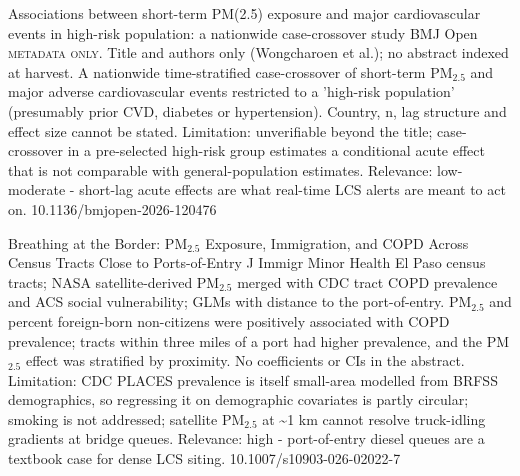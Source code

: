 \documentclass[10pt]{article}
\begin{document}
{Associations between short-term PM(2.5) exposure and major cardiovascular events in high-risk population: a nationwide case-crossover study}
{BMJ Open}
{\textsc{metadata only.} Title and authors only (Wongcharoen et al.); no abstract indexed at harvest. A nationwide time-stratified case-crossover of short-term PM$_{2.5}$ and major adverse cardiovascular events restricted to a 'high-risk population' (presumably prior CVD, diabetes or hypertension). Country, n, lag structure and effect size cannot be stated. Limitation: unverifiable beyond the title; case-crossover in a pre-selected high-risk group estimates a conditional acute effect that is not comparable with general-population estimates. Relevance: low-moderate - short-lag acute effects are what real-time LCS alerts are meant to act on.}
{10.1136/bmjopen-2026-120476}

\par{}\baselineskip{}\baselineskip
{}

{Breathing at the Border: PM$_{2.5}$ Exposure, Immigration, and COPD Across Census Tracts Close to Ports-of-Entry}
{J Immigr Minor Health}
{El Paso census tracts; NASA satellite-derived PM$_{2.5}$ merged with CDC tract COPD prevalence and ACS social vulnerability; GLMs with distance to the port-of-entry. PM$_{2.5}$ and percent foreign-born non-citizens were positively associated with COPD prevalence; tracts within three miles of a port had higher prevalence, and the PM$_{2.5}$ effect was stratified by proximity. No coefficients or CIs in the abstract. Limitation: CDC PLACES prevalence is itself small-area modelled from BRFSS demographics, so regressing it on demographic covariates is partly circular; smoking is not addressed; satellite PM$_{2.5}$ at \textasciitilde{}1 km cannot resolve truck-idling gradients at bridge queues. Relevance: high - port-of-entry diesel queues are a textbook case for dense LCS siting.}
{10.1007/s10903-026-02022-7}

\par{}\baselineskip{}\baselineskip
{}
\end{document}

